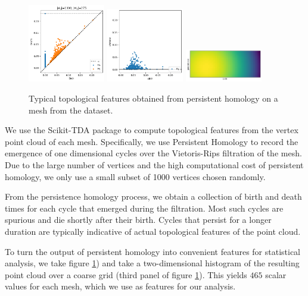 \documentclass[11pt]{article}
\begin{document}
\begin{figure}
    \centering
    \includegraphics[width=0.3\textwidth]{../plots/persistence-diagram.png}
    \includegraphics[width=0.3\textwidth]{../plots/birth-lifetime.png}
    \includegraphics[width=0.3\textwidth]{../plots/persistence-image.png}
    \caption{Typical topological features obtained from persistent homology on a mesh from the dataset.}
    \label{fig:tda}
\end{figure}

We use the Scikit-TDA package \cite{scikittda2019} to compute topological features from the vertex point cloud of each mesh. Specifically, we use Persistent Homology to record the emergence of one dimensional cycles over the Vietoris-Rips filtration of the mesh. Due to the large number of vertices and the high computational cost of persistent homology, we only use a small subset of 1000 vertices chosen randomly.

From the persistence homology process, we obtain a collection of birth and death times for each cycle that emerged during the filtration. Most such cycles are spurious and die shortly after their birth. Cycles that persist for a longer duration are typically indicative of actual topological features of the point cloud.

To turn the output of persistent homology into convenient features for statistical analysis, we take  figure \ref{fig:tda}) and take a two-dimensional histogram of the resulting point cloud over a coarse grid (third panel of figure \ref{fig:tda}). This yields $465$ scalar values for each mesh, which we use as features for our analysis.
\end{document}
